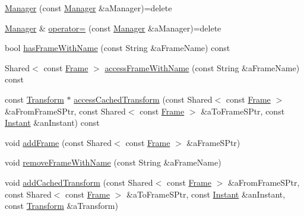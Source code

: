 \begin{DoxyCompactItemize}
\item 
\hyperlink{classlibrary_1_1physics_1_1coord_1_1frame_1_1_manager_a2a044628916a829eeaf4da33c2b187b3}{Manager} (const \hyperlink{classlibrary_1_1physics_1_1coord_1_1frame_1_1_manager}{Manager} \&a\+Manager)=delete
\item 
\hyperlink{classlibrary_1_1physics_1_1coord_1_1frame_1_1_manager}{Manager} \& \hyperlink{classlibrary_1_1physics_1_1coord_1_1frame_1_1_manager_a187a04c135f48ec850a1fd616dd92a3b}{operator=} (const \hyperlink{classlibrary_1_1physics_1_1coord_1_1frame_1_1_manager}{Manager} \&a\+Manager)=delete
\item 
bool \hyperlink{classlibrary_1_1physics_1_1coord_1_1frame_1_1_manager_a842f8a8060172178930aed212c4fcf6d}{has\+Frame\+With\+Name} (const String \&a\+Frame\+Name) const
\item 
Shared$<$ const \hyperlink{classlibrary_1_1physics_1_1coord_1_1_frame}{Frame} $>$ \hyperlink{classlibrary_1_1physics_1_1coord_1_1frame_1_1_manager_a13b4885965a111cebff6f04339d81596}{access\+Frame\+With\+Name} (const String \&a\+Frame\+Name) const
\item 
const \hyperlink{classlibrary_1_1physics_1_1coord_1_1_transform}{Transform} $\ast$ \hyperlink{classlibrary_1_1physics_1_1coord_1_1frame_1_1_manager_a0754fdf8670d625254c5acac8367a81e}{access\+Cached\+Transform} (const Shared$<$ const \hyperlink{classlibrary_1_1physics_1_1coord_1_1_frame}{Frame} $>$ \&a\+From\+Frame\+S\+Ptr, const Shared$<$ const \hyperlink{classlibrary_1_1physics_1_1coord_1_1_frame}{Frame} $>$ \&a\+To\+Frame\+S\+Ptr, const \hyperlink{classlibrary_1_1physics_1_1time_1_1_instant}{Instant} \&an\+Instant) const
\item 
void \hyperlink{classlibrary_1_1physics_1_1coord_1_1frame_1_1_manager_a65ef93583a62089cb3192527babddab6}{add\+Frame} (const Shared$<$ const \hyperlink{classlibrary_1_1physics_1_1coord_1_1_frame}{Frame} $>$ \&a\+Frame\+S\+Ptr)
\item 
void \hyperlink{classlibrary_1_1physics_1_1coord_1_1frame_1_1_manager_a63e05e289d34f354dafefbff2b8478af}{remove\+Frame\+With\+Name} (const String \&a\+Frame\+Name)
\item 
void \hyperlink{classlibrary_1_1physics_1_1coord_1_1frame_1_1_manager_a4c1070c91adb2bccc92c685d3f7bfc0b}{add\+Cached\+Transform} (const Shared$<$ const \hyperlink{classlibrary_1_1physics_1_1coord_1_1_frame}{Frame} $>$ \&a\+From\+Frame\+S\+Ptr, const Shared$<$ const \hyperlink{classlibrary_1_1physics_1_1coord_1_1_frame}{Frame} $>$ \&a\+To\+Frame\+S\+Ptr, const \hyperlink{classlibrary_1_1physics_1_1time_1_1_instant}{Instant} \&an\+Instant, const \hyperlink{classlibrary_1_1physics_1_1coord_1_1_transform}{Transform} \&a\+Transform)
\end{DoxyCompactItemize}
